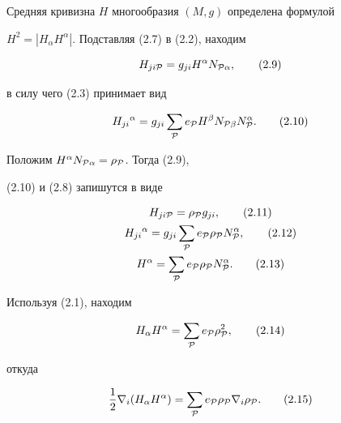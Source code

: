 Средняя кривизна $H$ многообразия $(M,g)$ определена формулой


$H^2=|H_\alpha H^\alpha|$. Подставляя (2.7) в (2.2), находим


\begin{equation}


H_{ji\cal P}=g_{ji}H^\alpha N_{\cal P\alpha},\tag{2.9}


\end{equation}


в силу чего (2.3) принимает вид


\begin{equation}


H_{ji}{}^\alpha=g_{ji}\sum_{\cal P}e_{\cal P}


H^\beta N_{\cal P\beta}N^\alpha_{\cal P}.\tag{2.10}


\end{equation}


Положим $H^\alpha N_{\cal P\alpha}=\rho_{\cal P}$. Тогда (2.9),


(2.10) и (2.8) запишутся в виде


\begin{gather}


H_{ji\cal P}=\rho_{\cal P}g_{ji},\tag{2.11} \\


H_{ji}{}^\alpha=g_{ji}\sum_{\cal P}e_{\cal P}


\rho_{\cal P}N^\alpha_{\cal P},\tag{2.12} \\


H^\alpha=\sum_{\cal P}e_{\cal P}\rho_{\cal P}


N^\alpha_{\cal P}.\tag{2.13}


\end{gather}


Используя (2.1), находим


\begin{equation}


H_\alpha H^\alpha=\sum_{\cal P}e_{\cal P}\rho^2_{\cal P},\tag{2.14}


\end{equation}


откуда


\begin{equation}


\frac{1}{2}\nabla_i(H_\alpha H^\alpha)=\sum_{\cal P}


e_{\cal P}\rho_{\cal P}\nabla_i\rho_{\cal P}.\tag{2.15}


\end{equation}


